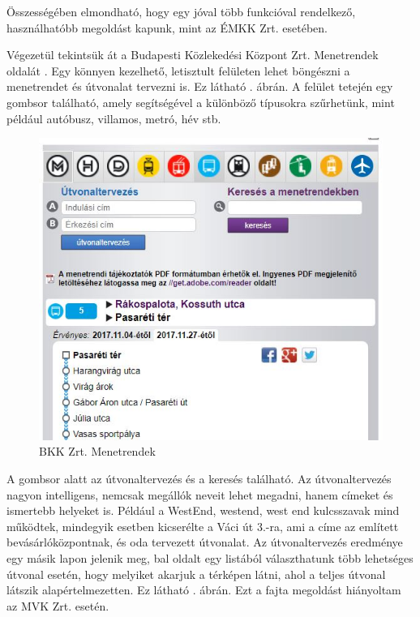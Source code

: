 Összességében elmondható, hogy egy jóval több funkcióval rendelkező, használhatóbb megoldást kapunk, mint az ÉMKK Zrt. esetében.

Végezetül tekintsük át a Budapesti Közlekedési Központ Zrt. Menetrendek oldalát \cite{bkk}. Egy könnyen kezelhető, letisztult felületen lehet böngészni a menetrendet és útvonalat tervezni is. Ez látható . ábrán. A felület tetején egy gombsor található, amely segítségével a különböző típusokra szűrhetünk, mint például autóbusz, villamos, metró, hév stb.

\begin{figure}[h!]
\centering
\includegraphics[scale=0.8]{kepek/bkk_menetrend.jpg}
\caption{BKK Zrt. Menetrendek}
\label{fig:bkk_menetrend}
\end{figure}

A gombsor alatt az útvonaltervezés és a keresés található. Az útvonaltervezés nagyon intelligens, nemcsak megállók neveit lehet megadni, hanem címeket és ismertebb helyeket is. Például a WestEnd, westend, west end kulcsszavak mind működtek, mindegyik esetben kicserélte a Váci út 3.-ra, ami a címe az említett bevásárlóközpontnak, és oda tervezett útvonalat. Az útvonaltervezés eredménye egy másik lapon jelenik meg, bal oldalt egy listából választhatunk több lehetséges útvonal esetén, hogy melyiket akarjuk a térképen látni, ahol a teljes útvonal látszik alapértelmezetten. Ez látható . ábrán. Ezt a fajta megoldást hiányoltam az MVK Zrt. esetén.

